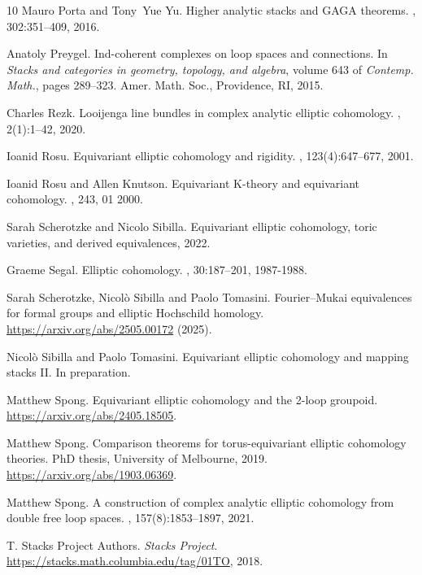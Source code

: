 \documentclass[11pt,letterpaper]{amsart}
\begin{document}
\begin{thebibliography}{10}
Mauro Porta and Tony~Yue Yu.
\newblock Higher analytic stacks and {GAGA} theorems.
, 302:351--409, 2016.

Anatoly Preygel.
\newblock Ind-coherent complexes on loop spaces and connections.
\newblock In {\em Stacks and categories in geometry, topology, and algebra},
  volume 643 of {\em Contemp. Math.}, pages 289--323. Amer. Math. Soc.,
  Providence, RI, 2015.
  
Charles Rezk. 
\newblock Looijenga line bundles in complex analytic elliptic cohomology. 
,
2(1):1–42, 2020.

Ioanid Rosu.
\newblock Equivariant elliptic cohomology and rigidity.
, 123(4):647--677, 2001.

Ioanid Rosu and Allen Knutson.
\newblock Equivariant {K}-theory and equivariant cohomology.
, 243, 01 2000.

Sarah Scherotzke and Nicolo Sibilla.
\newblock Equivariant elliptic cohomology, toric varieties, and derived
  equivalences, 2022.

Graeme Segal.
\newblock Elliptic cohomology.
, 30:187--201, 1987-1988.


Sarah Scherotzke, Nicolò Sibilla and Paolo Tomasini.
\newblock Fourier--Mukai equivalences for formal groups and elliptic Hochschild homology.
\newblock   \url{https://arxiv.org/abs/2505.00172} (2025). 

Nicolò Sibilla and Paolo Tomasini.
\newblock Equivariant elliptic cohomology and mapping stacks {II}.
\newblock In preparation.

Matthew Spong. 
\newblock Equivariant elliptic cohomology and the 2-loop groupoid.
\newblock \url{https://arxiv.org/abs/2405.18505}.

Matthew Spong. 
\newblock Comparison theorems for torus-equivariant elliptic cohomology theories. 
\newblock PhD thesis, University of Melbourne, 2019. \url{https://arxiv.org/abs/1903.06369}.

Matthew Spong. 
\newblock A construction of complex analytic elliptic cohomology from double free loop
spaces. 
, 157(8):1853–1897, 2021.

T. {Stacks Project Authors}.
\newblock \textit{Stacks Project}.
\newblock \url{https://stacks.math.columbia.edu/tag/01TO}, 2018.


\end{thebibliography}
\end{document}
